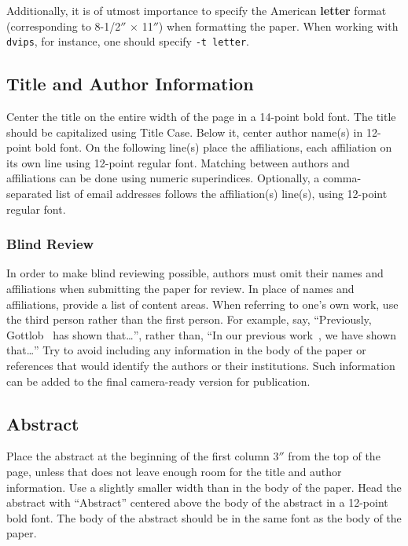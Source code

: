 \documentclass{article}
\begin{document}
Additionally, it is of utmost importance to specify the American {\bf
letter} format (corresponding to 8-1/2$''$ $\times$ 11$''$) when
formatting the paper. When working with {\tt dvips}, for instance, one
should specify {\tt -t letter}.

\subsection{Title and Author Information}

Center the title on the entire width of the page in a 14-point bold
font. The title should be capitalized using Title Case. Below it, center author name(s) in  12-point bold font. On the following line(s) place the affiliations, each affiliation on its own line using 12-point regular font. Matching between authors and affiliations can be done using numeric superindices. Optionally, a comma-separated list of email addresses follows the affiliation(s) line(s), using  12-point regular font.

\subsubsection{Blind Review}

In order to make blind reviewing possible, authors must omit their
names and affiliations when submitting the paper for review. In place
of names and affiliations, provide a list of content areas. When
referring to one's own work, use the third person rather than the
first person. For example, say, ``Previously,
Gottlob~ has shown that\ldots'', rather
than, ``In our previous work~\cite{gottlob:nonmon}, we have shown
that\ldots'' Try to avoid including any information in the body of the
paper or references that would identify the authors or their
institutions. Such information can be added to the final camera-ready
version for publication.

\subsection{Abstract}

Place the abstract at the beginning of the first column 3$''$ from the
top of the page, unless that does not leave enough room for the title
and author information. Use a slightly smaller width than in the body
of the paper. Head the abstract with ``Abstract'' centered above the
body of the abstract in a 12-point bold font. The body of the abstract
should be in the same font as the body of the paper.
\end{document}
